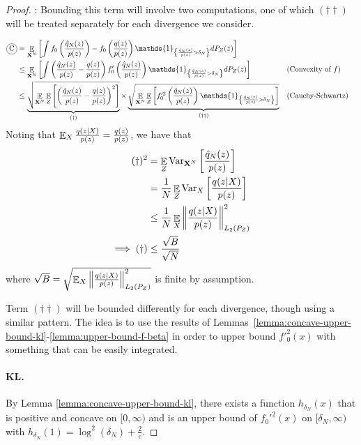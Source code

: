 \begin{proof}
:
Bounding this term will involve two computations, one of which $(\dagger\dagger)$ will be treated separately for each divergence we consider.

\begin{align*}
    \encircle{C} &= \E_{\XN}\left[\int f_0\left( \frac{\hat{q}_N(z)}{p(z)}\right) - f_0\left( \frac{q(z)}{p(z)} \right) \mathds{1}_{\left\lbrace \frac{\hat{q}_N(z)}{p(z)} > \delta_N \right\rbrace} dP_Z(z)\right] \\
    &\leq \E_{\XN} \left[ \int \left(\frac{\hat{q}_N(z)}{p(z)} - \frac{q(z)}{p(z)}\right) f'_0\left(\frac{\hat{q}_N(z)}{p(z)} \right) \mathds{1}_{\left\lbrace \frac{\hat{q}_N(z)}{p(z)} > \delta_N \right\rbrace} dP_Z(z) \right]
    && \text{(Convexity of $f$)}
    \\
    &\leq \underbrace{\sqrt{\E_{\XN} \E_{Z}\left[ \left(\frac{\hat{q}_N(z)}{p(z)} - \frac{q(z)}{p(z)}\right)^2 \right]}}_{(\dagger)} \times 
    \underbrace{\sqrt{\E_{\XN} \E_{Z} \left[ f'^2_0\left(\frac{\hat{q}_N(z)}{p(z)} \right) \mathds{1}_{\left\lbrace \frac{\hat{q}_N(z)}{p(z)} > \delta_N \right\rbrace} \right]}}_{(\dagger\dagger)}
    && \text{(Cauchy-Schwartz)}
\end{align*}
Noting that $\mathop{\mathbb{E}}_{X} \frac{q(z|X)}{p(z)} = \frac{q(z)}{p(z)}$, we have that
\begin{align*}
    (\dagger)^2
    &= \mathop{\mathbb{E}}_Z \text{Var}_{\mathbf{X}^N} \left[ \frac{\hat{q}_N(z)}{p(z)}\right] \\
    &=  \frac{1}{N} \mathop{\mathbb{E}}_Z \text{Var}_{X} \left[ \frac{q(z|X)}{p(z)}\right] \\
    &\leq \frac{1}{N} \mathop{\mathbb{E}}_X \left\|\frac{q(z|X)}{p(z)} \right\|^2_{L_2(P_Z)}\\
    \implies (\dagger) &\leq \frac{\sqrt{B}}{\sqrt{N}}
\end{align*}
where $\sqrt{B} = \sqrt{\mathop{\mathbb{E}}_X \left\|\frac{q(z|X)}{p(z)} \right\|^2_{L_2(P_Z)}}$ is finite by assumption.

Term $(\dagger\dagger)$ will be bounded differently for each divergence, though using a similar pattern. 
The idea is to use the results of Lemmas~\ref{lemma:concave-upper-bound-kl}-\ref{lemma:upper-bound-f-beta} in order to upper bound $f'^2_0(x)$ with something that can be easily integrated.

\paragraph{KL.}

By Lemma \ref{lemma:concave-upper-bound-kl}, there exists a function $h_{\delta_N}(x)$ that is positive and concave on $[0, \infty)$ and is an upper bound of $f_0'^2(x)$ on $[\delta_N, \infty)$ with $h_{\delta_N}(1) = \log^2(\delta_N) + \frac{2}{e}$.


\end{proof}
